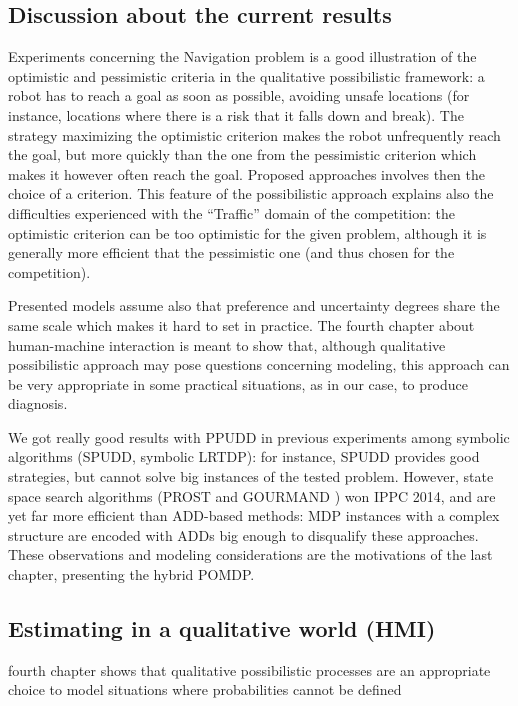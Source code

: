 \subsection*{Discussion about the current results}
Experiments concerning the Navigation problem
is a good illustration of the optimistic and pessimistic criteria
in the qualitative possibilistic framework: 
a robot has to reach a goal as soon as possible,
avoiding unsafe locations 
(for instance, locations where there is a risk that it falls down and break).
The strategy maximizing 
the optimistic criterion 
makes the robot 
unfrequently reach the goal,
but more quickly
than the one from the pessimistic criterion
which makes it however often reach the goal.  
Proposed approaches involves then 
the choice of a criterion.
This feature of the possibilistic approach
explains also the difficulties experienced
with the ``Traffic'' domain
of the competition: 
the optimistic criterion can be too optimistic
for the given problem, 
although it is generally 
more efficient that the pessimistic one
(and thus chosen for the competition).

Presented models 
assume also that preference
and uncertainty degrees
share the same scale
which makes it hard to
set in practice.
The fourth chapter about human-machine interaction
is meant to show that,
although qualitative possibilistic approach
may pose questions concerning modeling,
this approach can be very appropriate
in some practical situations,
as in our case, to produce diagnosis.

We got really good results 
with PPUDD in previous experiments 
among symbolic algorithms (SPUDD, symbolic LRTDP):
for instance, SPUDD provides good strategies, but 
cannot solve big instances of the tested problem. 
However, state space search algorithms
(PROST \cite{DBLP:conf/aips/KellerE12} and GOURMAND \cite{DBLP:conf/aaai/KolobovMW12}) won IPPC 2014,
and are yet far more efficient than ADD-based methods:
MDP instances with a complex structure
are encoded with ADDs big enough
to disqualify these approaches.
These observations and modeling considerations
are the motivations of the last chapter,
presenting the hybrid POMDP.


\subsection*{Estimating in a qualitative world (HMI)}
fourth chapter shows that 
qualitative possibilistic processes
are an appropriate choice
to model situations 
where probabilities 
cannot be defined

